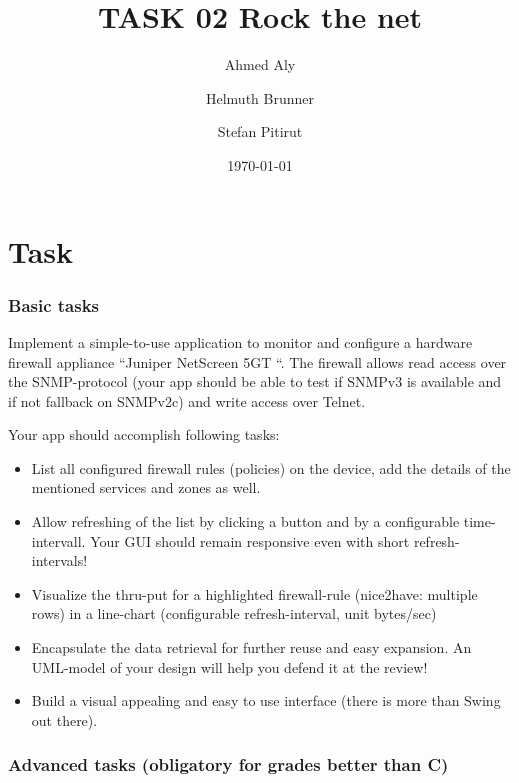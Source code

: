 \documentclass[a4paper,12pt]{scrreprt}
\begin{document}
 
\author{Ahmed Aly \and Helmuth Brunner \and Stefan Pitirut } %
\title{TASK 02 Rock the net } %
\subject{SEW} %
\date{\today} %
\publishers{5AHITT} %

\maketitle
\tableofcontents


\chapter{Task}

\subsection{Basic tasks}

Implement a simple-to-use application to monitor and configure a hardware firewall appliance “Juniper NetScreen 5GT “. The firewall allows read access over the SNMP-protocol (your app should be able to test if SNMPv3 is available and if not fallback on SNMPv2c) and write access over Telnet.

Your app should accomplish following tasks:
\begin{itemize}

    \item List all configured firewall rules (policies) on the device, add the details of the mentioned services and zones as well.

    \item Allow refreshing of the list by clicking a button and by a configurable time-intervall. Your GUI should remain responsive even with short refresh-intervals!

    \item Visualize the thru-put for a highlighted firewall-rule (nice2have: multiple rows) in a line-chart (configurable refresh-interval, unit bytes/sec)

    \item Encapsulate the data retrieval for further reuse and easy expansion. An UML-model of your design will help you defend it at the review!

    \item Build a visual appealing and easy to use interface (there is more than Swing out there).
\end{itemize}
\subsection{Advanced tasks (obligatory for grades better than C)}
\end{document}
